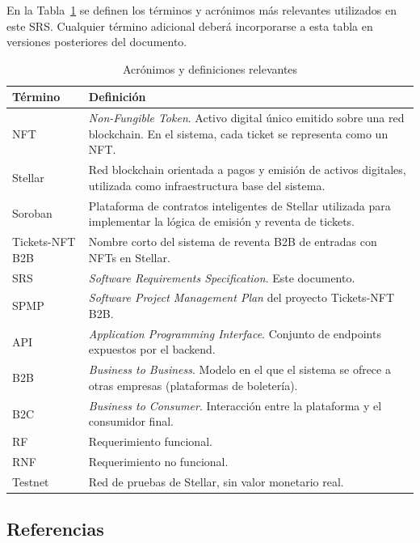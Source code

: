 \documentclass[12pt,letterpaper]{article}
\begin{document}
En la Tabla~\ref{tab:acronimos} se definen los términos y acrónimos más
relevantes utilizados en este SRS. Cualquier término adicional deberá
incorporarse a esta tabla en versiones posteriores del documento.
\begin{table}[ht]
    \centering
    \begin{tabular}{p{3cm}p{10cm}}
        \toprule
        \textbf{Término} & \textbf{Definición} \\
        \midrule
        NFT & \textit{Non-Fungible Token}. Activo digital único emitido sobre una red blockchain. En el sistema, cada ticket se representa como un NFT. \\
        Stellar & Red blockchain orientada a pagos y emisión de activos digitales, utilizada como infraestructura base del sistema. \\
        Soroban & Plataforma de contratos inteligentes de Stellar utilizada para implementar la lógica de emisión y reventa de tickets. \\
        Tickets-NFT B2B & Nombre corto del sistema de reventa B2B de entradas con NFTs en Stellar. \\
        SRS & \textit{Software Requirements Specification}. Este documento. \\
        SPMP & \textit{Software Project Management Plan} del proyecto Tickets-NFT B2B. \\
        API & \textit{Application Programming Interface}. Conjunto de endpoints expuestos por el backend. \\
        B2B & \textit{Business to Business}. Modelo en el que el sistema se ofrece a otras empresas (plataformas de boletería). \\
        B2C & \textit{Business to Consumer}. Interacción entre la plataforma y el consumidor final. \\
        RF & Requerimiento funcional. \\
        RNF & Requerimiento no funcional. \\
        Testnet & Red de pruebas de Stellar, sin valor monetario real. \\
        \bottomrule
    \end{tabular}
    \caption{Acrónimos y definiciones relevantes}
    \label{tab:acronimos}
\end{table}

\subsection{Referencias}
\end{document}
